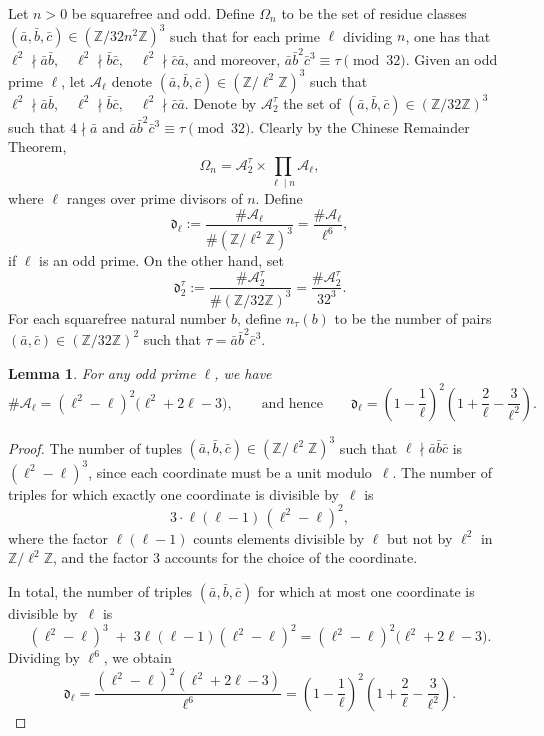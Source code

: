 \documentclass[table]{amsart}
\newtheorem{lemma}[theorem]{Lemma}
\newcommand{\Z}{\mathbb{Z}}
\numberwithin{equation}{section}
\begin{document}
Let $n>0$ be squarefree and odd. Define $\Omega_n$ to be the set of residue classes $(\bar{a}, \bar{b}, \bar{c}) \in (\Z/32n^2\Z)^3$ such that for each prime $\ell$ dividing $n$, one has that $\ell^2 \nmid \bar{a} \bar{b},\quad \ell^2 \nmid \bar{b} \bar{c},\quad \ell^2 \nmid \bar{c} \bar{a}
$, and moreover, $\bar{a}\bar{b}^2\bar{c}^3\equiv \tau\pmod{32}$. Given an odd prime $\ell$, let $\mathcal{A}_\ell$ denote $(\bar{a}, \bar{b}, \bar{c}) \in (\Z/\ell^2\Z)^3$ such that $\ell^2 \nmid \bar{a} \bar{b},\quad \ell^2 \nmid \bar{b} \bar{c},\quad \ell^2 \nmid \bar{c} \bar{a}
$. Denote by $\mathcal{A}_2^\tau$ the set of $(\bar{a}, \bar{b}, \bar{c}) \in (\Z/32\Z)^3$ such that $4\nmid \bar{a}$ and $\bar{a}\bar{b}^2\bar{c}^3\equiv \tau\pmod{32}$. Clearly by the Chinese Remainder Theorem,
$$
\Omega_n = \mathcal{A}_2^\tau\times \prod_{\ell \mid n} \mathcal{A}_\ell,
$$
where $\ell$ ranges over prime divisors of $n$. Define $$
\mathfrak{d}_\ell := \frac{\# \mathcal{A}_\ell}{\# (\Z/\ell^2\Z)^3} = \frac{\# \mathcal{A}_\ell}{\ell^6},
$$ if $\ell$ is an odd prime. On the other hand, set 
\[\mathfrak{d}_2^\tau := \frac{\# \mathcal{A}_2^\tau}{\# (\Z/32\Z)^3} = \frac{\# \mathcal{A}_2^\tau}{32^3}.\] For each squarefree natural number $b$, define $n_\tau(b)$ to be the number of pairs $(\bar{a}, \bar{c})\in (\Z/32\Z)^2$ such that $\tau=\bar{a}\bar{b}^2\bar{c}^3$.

\begin{lemma}
For any odd prime $\ell$, we have
$$
\# \mathcal{A}_\ell = (\ell^2-\ell)^2\bigl(\ell^2+2\ell-3\bigr), \qquad \text{and hence} \qquad \mathfrak{d}_\ell = \left(1-\frac{1}{\ell}\right)^2
\left(1+\frac{2}{\ell}-\frac{3}{\ell^2}\right).
$$

\end{lemma}

\begin{proof} The number of tuples $(\bar{a},\bar{b},\bar{c})\in(\Z/\ell^2\Z)^3$ such that
$\ell\nmid \bar{a}\bar{b}\bar{c}$ is $(\ell^2-\ell)^3$, since each coordinate
must be a unit modulo~$\ell$.  
The number of triples for which exactly one coordinate is divisible by~$\ell$
is
\[
3\cdot \ell(\ell-1)\,(\ell^2-\ell)^2,
\]
where the factor $\ell(\ell-1)$ counts elements divisible by $\ell$ but not by
$\ell^2$ in $\Z/\ell^2\Z$, and the factor $3$ accounts for the choice of the
coordinate.

In total, the number of triples $(\bar{a},\bar{b},\bar{c})$ for which at most one
coordinate is divisible by~$\ell$ is
\[
(\ell^2-\ell)^3
\;+\;
3\ell(\ell-1)(\ell^2-\ell)^2
=
(\ell^2-\ell)^2\bigl(\ell^2+2\ell-3\bigr).
\]
Dividing by $\ell^6$, we obtain
\[
\mathfrak{d}_\ell=\frac{(\ell^2-\ell)^2(\ell^2+2\ell-3)}{\ell^6}
=
\left(1-\frac{1}{\ell}\right)^2
\left(1+\frac{2}{\ell}-\frac{3}{\ell^2}\right).
\]
\end{proof}
\end{document}
